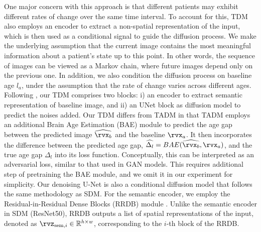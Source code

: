 One major concern with this approach is that different patients may exhibit different rates of change over the same time interval. To account for this, TDM also employs an encoder to extract a non-spatial representation of the input, which is then used as a conditional signal to guide the diffusion process. We make the underlying assumption that the current image contains the most meaningful information about a patient’s state up to this point. In other words, the sequence of images can be viewed as a Markov chain, where future images depend only on the previous one. In addition, we also condition the diffusion process on baseline age $l_a$, under the assumption that the rate of change varies across different ages. Following \cite{litricoTADMTemporallyAwareDiffusion2024}, our TDM comprises two blocks: i) an encoder to extract semantic representation of baseline image, and ii) an UNet block as diffusion model to predict the noises added. Our TDM differs from TADM in that TADM employs an additional Brain Age Estimation (BAE) module to predict the age gap between the predicted image $\widehat{\rvx_b}$ and the baseline $\rvx_a$. It then incorporates the difference between the predicted age gap, $\widehat{\Delta_l} = BAE(\widehat{\rvx_b}, \rvx_a)$, and the true age gap $\Delta_l$ into its loss function. Conceptually, this can be interpreted as an adversarial loss, similar to that used in \ac{GAN} models. This requires additional step of pretraining the BAE module, and we omit it in our experiment for simplicity. Our denoising U-Net is also a conditional diffusion model that follows the same methodology as SDM. For the semantic encoder, we employ the Residual-in-Residual Dense Blocks (RRDB) module \cite{zhang2018RRDB}. Unlike the semantic encoder in SDM (ResNet50), RRDB outputs a list of spatial representations of the input, denoted as $\rvz_{\text{sem}, i} \in \mathbb{R}^{h \times w}$, corresponding to the $i$-th block of the RRDB.
